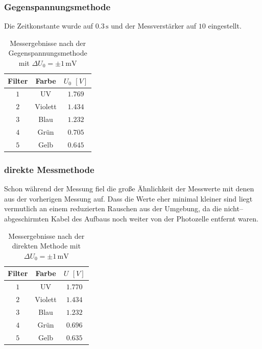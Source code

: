 \documentclass[12pt,a4paper]{scrartcl}
\numberwithin{equation}{section} %
\begin{document}
\subsubsection{Gegenspannungsmethode}
Die Zeitkonstante wurde auf $0.3\mathrm{\,s}$ und der Messverstärker auf $10$ eingestellt.

\begin{table}[h!]
	\centering
	\begin{tabular}{c|c|c}
		Filter & Farbe & $U_0$ $[V]$ \\
		\hline
		$1$ & UV & $1.769$ \\
		$2$ & Violett & $1.434$ \\
		$3$ & Blau & $1.232$ \\
		$4$ & Grün & $0.705$ \\
		$5$ & Gelb & $0.645$ \\
	\end{tabular}
	\caption{Messergebnisse nach der Gegenspannungsmethode mit $\Delta U_0=\pm 1\mathrm{\,mV}$}
	\label{tab:Gegenspannungsmethode}
\end{table}

\subsubsection{direkte Messmethode}
Schon während der Messung fiel die große Ähnlichkeit der Messwerte mit denen aus der vorherigen Messung auf. Dass die Werte eher minimal kleiner sind liegt vermutlich an einem reduzierten Rauschen aus der Umgebung, da die nicht--abgeschirmten Kabel des Aufbaus noch weiter von der Photozelle entfernt waren.

\begin{table}[h!]
	\centering
	\begin{tabular}{c|c|c}
		Filter & Farbe & $U$ $[V]$ \\
		\hline
		$1$ & UV & $1.770$ \\
		$2$ & Violett & $1.434$ \\
		$3$ & Blau & $1.232$ \\
		$4$ & Grün & $0.696$ \\
		$5$ & Gelb & $0.635$ \\
	\end{tabular}
	\caption{Messergebnisse nach der direkten Methode mit $\Delta U_0=\pm 1\mathrm{\,mV}$}
	\label{tab:direkten Methode}
\end{table}
\end{document}
